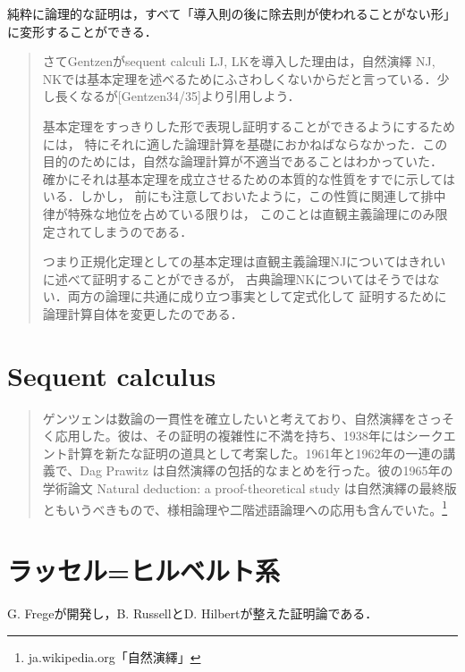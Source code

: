 \documentclass[uplatex, 12pt, dvipdfmx]{jsreport}
\begin{document}
\begin{theorem}
    純粋に論理的な証明は，すべて「導入則の後に除去則が使われることがない形」に変形することができる．
\end{theorem}

\begin{quotation}
    さてGentzenがsequent calculi LJ, LKを導入した理由は，自然演繹 NJ, NKでは基本定理を述べるためにふさわしくないからだと言っている．少し長くなるが[Gentzen34/35]より引用しよう．

    基本定理をすっきりした形で表現し証明することができるようにするためには，
    特にそれに適した論理計算を基礎におかねばならなかった．この目的のためには，自然な論理計算が不適当であることはわかっていた．
    確かにそれは基本定理を成立させるための本質的な性質をすでに示してはいる．しかし，
    前にも注意しておいたように，この性質に関連して排中律が特殊な地位を占めている限りは，
    このことは直観主義論理にのみ限定されてしまうのである．

    つまり正規化定理としての基本定理は直観主義論理NJについてはきれいに述べて証明することができるが，
    古典論理NKについてはそうではない．両方の論理に共通に成り立つ事実として定式化して
    証明するために論理計算自体を変更したのである．\cite{新井敏康-Gentzen}
\end{quotation}

\section{Sequent calculus}
\begin{quote}
    ゲンツェンは数論の一貫性を確立したいと考えており、自然演繹をさっそく応用した。彼は、その証明の複雑性に不満を持ち、1938年にはシークエント計算を新たな証明の道具として考案した。1961年と1962年の一連の講義で、Dag Prawitz は自然演繹の包括的なまとめを行った。彼の1965年の学術論文 Natural deduction: a proof-theoretical study は自然演繹の最終版ともいうべきもので、様相論理や二階述語論理への応用も含んでいた。\footnote{ja.wikipedia.org「自然演繹」}
\end{quote}



\section{ラッセル=ヒルベルト系}
G. Fregeが開発し，B. RussellとD. Hilbertが整えた証明論である．
\end{document}
